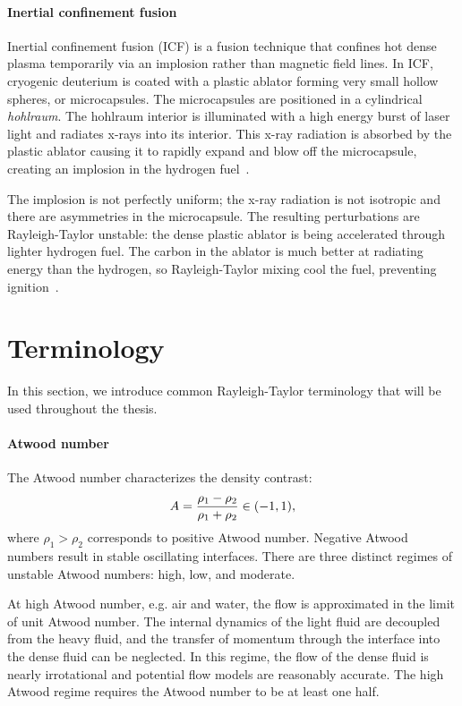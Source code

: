 \paragraph{Inertial confinement fusion}
Inertial confinement fusion (ICF) is a fusion technique that confines hot dense plasma temporarily via an implosion rather than magnetic field lines.
In ICF, cryogenic deuterium is coated with a plastic ablator forming very small hollow spheres, or microcapsules.
The microcapsules are positioned in a cylindrical \textit{hohlraum}.
The hohlraum interior is illuminated with a high energy burst of laser light and radiates x-rays into its interior.
This x-ray radiation is absorbed by the plastic ablator causing it to rapidly expand and blow off the microcapsule, creating an implosion in the hydrogen fuel~\cite{NASICF}.

The implosion is not perfectly uniform; the x-ray radiation is not isotropic and there are asymmetries in the microcapsule.
The resulting perturbations are Rayleigh-Taylor unstable: the dense plastic ablator is being accelerated through lighter hydrogen fuel.
The carbon in the ablator is much better at radiating energy than the hydrogen, so Rayleigh-Taylor mixing cool the fuel, preventing ignition~\cite{goncharov2012panel}.

\section{Terminology}

In this section, we introduce common Rayleigh-Taylor terminology that will be used throughout the thesis.

\paragraph{Atwood number}
The Atwood number characterizes the density contrast:
\begin{equation} \elabel{atwood}
A = \frac{\rho_1 - \rho_2}{\rho_1 + \rho_2} \in (-1,1),
\end{equation}
where $\rho_1 > \rho_2$ corresponds to positive Atwood number.
Negative Atwood numbers result in stable oscillating interfaces.
There are three distinct regimes of unstable Atwood numbers: high, low, and moderate.

At high Atwood number, e.g. air and water, the flow is approximated in the limit of unit Atwood number.
The internal dynamics of the light fluid are decoupled from the heavy fluid, and the transfer of momentum through the interface into the dense fluid can be neglected.
In this regime, the flow of the dense fluid is nearly irrotational and potential flow models are reasonably accurate.
The high Atwood regime requires the Atwood number to be at least one half.

